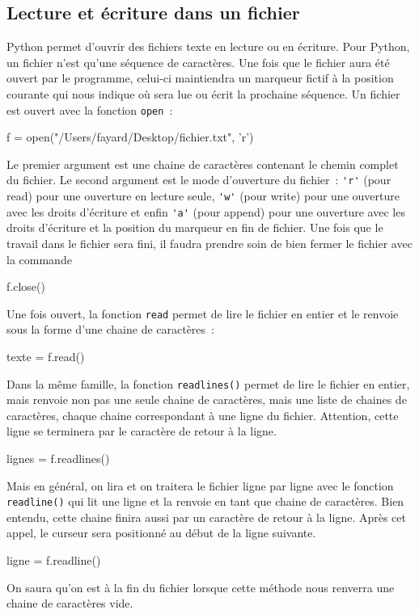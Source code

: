 \documentclass{magnolia}
\begin{document}
\subsection{Lecture et écriture dans un fichier}

Python permet d'ouvrir des fichiers texte en lecture ou en écriture. Pour Python, un
fichier n'est qu'une séquence de caractères. Une fois que le fichier aura été ouvert
par le programme, celui-ci maintiendra un marqueur fictif à la position courante qui
nous indique où sera lue ou écrit la prochaine séquence. Un fichier est ouvert avec la
fonction \verb!open!~:

\begin{pythoncode}
f = open("/Users/fayard/Desktop/fichier.txt", 'r')
\end{pythoncode}
\noindent
Le premier argument est une chaine de caractères contenant le chemin complet du fichier.
Le second argument est le mode d'ouverture du fichier~: \verb_'r'_ (pour read)
pour une ouverture en lecture seule, \verb_'w'_ (pour write)
pour une ouverture avec les droits d'écriture et enfin \verb_'a'_ (pour append)
pour une ouverture avec les droits d'écriture et la position du marqueur en fin
de fichier. Une fois que le travail dans le fichier sera fini, il faudra prendre soin
de bien fermer le fichier avec la commande
\begin{pythoncode}
f.close()
\end{pythoncode}

\medskip
Une fois ouvert, la fonction \verb!read! permet de lire le fichier en entier et le renvoie sous la forme
d'une chaine de caractères~:
\begin{pythoncode}
texte = f.read()
\end{pythoncode}
Dans la même famille, la fonction \verb!readlines()! permet de lire le fichier en entier,
mais renvoie non pas une seule chaine de caractères, mais une liste de chaines
de caractères, chaque chaine correspondant à une ligne du fichier. Attention, cette
ligne se terminera par le caractère de retour à la ligne.
\begin{pythoncode}
lignes = f.readlines()
\end{pythoncode}
Mais en général, on lira et on traitera le fichier ligne par ligne avec le fonction
\verb!readline()! qui lit une ligne et la renvoie en tant que chaine de caractères.
Bien entendu, cette chaine finira aussi par un caractère de retour à la ligne. Après
cet appel, le curseur sera positionné au début de la ligne suivante.
\begin{pythoncode}
ligne = f.readline()
\end{pythoncode}
On saura qu'on est à la fin du fichier lorsque cette méthode nous renverra une chaine
de caractères vide.\\
\end{document}
